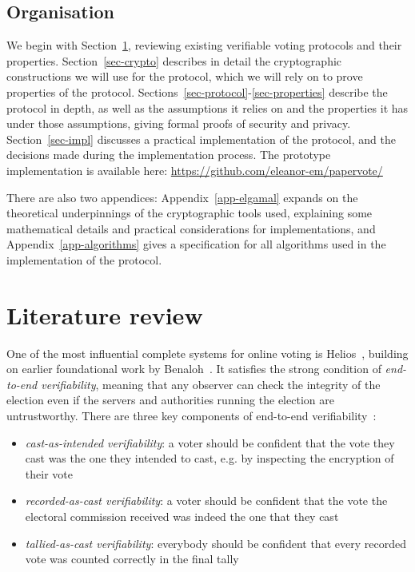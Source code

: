 \documentclass[12pt,a4paper]{article}
\theoremstyle{definition}
\begin{document}
\subsection{Organisation}
We begin with Section~\ref{sec-litrev}, reviewing existing verifiable voting protocols and their properties. Section~\ref{sec-crypto} describes in detail the cryptographic constructions we will use for the protocol, which we will rely on to prove properties of the protocol. Sections~\ref{sec-protocol}-\ref{sec-properties} describe the protocol in depth, as well as the assumptions it relies on and the properties it has under those assumptions, giving formal proofs of security and privacy. Section~\ref{sec-impl} discusses a practical implementation of the protocol, and the decisions made during the implementation process. The prototype implementation is available here: \url{https://github.com/eleanor-em/papervote/}

There are also two appendices: Appendix~\ref{app-elgamal} expands on the theoretical underpinnings of the cryptographic tools used, explaining some mathematical details and practical considerations for implementations, and Appendix~\ref{app-algorithms} gives a specification for all algorithms used in the implementation of the protocol.

\section{Literature review}\label{sec-litrev}
One of the most influential complete systems for online voting is Helios~\cite{adida2008helios}, building on earlier foundational work by Benaloh~\cite{benaloh2006simple}. It satisfies the strong condition of \textit{end-to-end verifiability}, meaning that any observer can check the integrity of the election even if the servers and authorities running the election are untrustworthy. There are three key components of end-to-end verifiability~\cite{DBLP:journals/corr/BenalohRRSTV15}:

\begin{itemize}
    \item \textit{cast-as-intended verifiability}: a voter should be confident that the vote they cast was the one they intended to cast, e.g. by inspecting the encryption of their vote
    \item \textit{recorded-as-cast verifiability}: a voter should be confident that the vote the electoral commission received was indeed the one that they cast
    \item \textit{tallied-as-cast verifiability}: everybody should be confident that every recorded vote was counted correctly in the final tally
\end{itemize}
\end{document}
